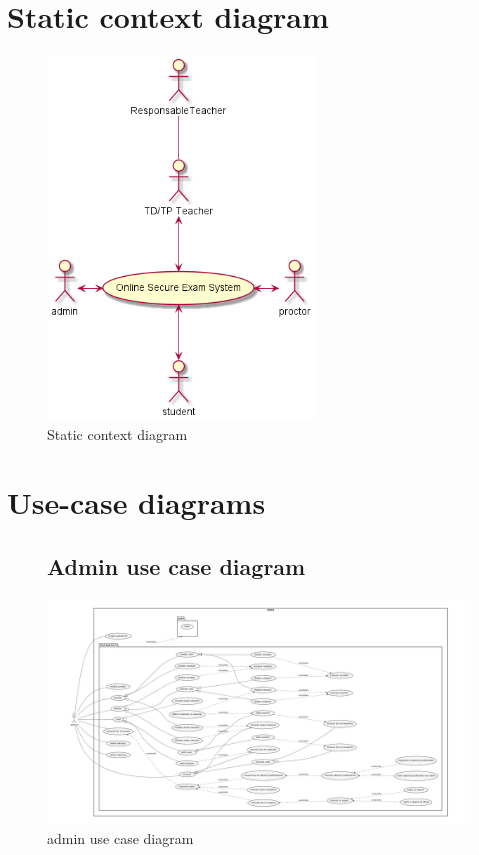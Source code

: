 \documentclass[]{uc2pfecaneva}
\begin{document}
    \raggedright\section{Static context diagram}
    \begin{figure}[h]

        \centering
        \includegraphics[width=200pt]{images/SCD}
        \caption{Static context diagram}
    \end{figure}



    \raggedright\section{Use-case diagrams}
    \begin{figure}
        \subsection{Admin use case diagram}
        \centering
        \includegraphics[width=\textwidth]{images/admin_UCD}
        \caption{admin use case diagram}
    \end{figure}
    \clearpage
\end{document}
